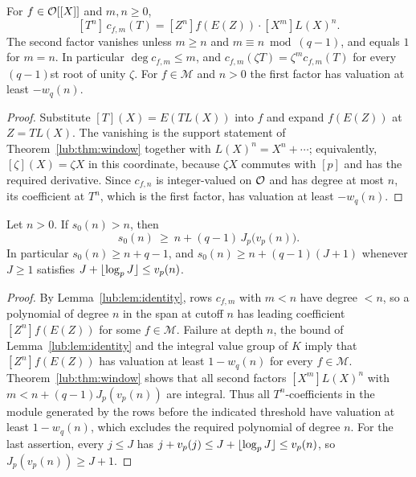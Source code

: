 \begin{lemma}\label{lub:lem:identity}
For $f\in\mathcal{O}[[X]]$ and $m,n\ge0$,
\[
 [T^n]\,c_{f,m}(T)=[Z^n]f(E(Z))\cdot[X^m]L(X)^n .
\]
The second factor vanishes unless $m\ge n$ and $m\equiv n\bmod(q-1)$, and equals $1$ for
$m=n$. In particular $\deg c_{f,m}\le m$, and
$c_{f,m}(\zeta T)=\zeta^mc_{f,m}(T)$ for every $(q-1)$st root of unity $\zeta$. For
$f\in\mathcal M$ and $n>0$ the first factor has valuation at least $-w_q(n)$.
\end{lemma}
\begin{proof}
Substitute $[T](X)=E(TL(X))$ into $f$ and expand $f(E(Z))$ at $Z=TL(X)$. The vanishing is
the support statement of Theorem~\ref{lub:thm:window} together with $L(X)^n=X^n+\cdots$;
equivalently, $[\zeta](X)=\zeta X$ in this coordinate, because $\zeta X$ commutes with
$[p]$ and has the required derivative. Since $c_{f,n}$ is integer-valued on $\mathcal{O}$ and has
degree at most $n$, its coefficient at $T^n$, which is the first factor, has valuation at
least $-w_q(n)$.
\end{proof}

\begin{corollary}\label{lub:cor:obstruction}
Let $n>0$. If $s_0(n)>n$, then
\[
 s_0(n)\ \ge\ n+(q-1)\,J_p\bigl(v_p(n)\bigr).
\]
In particular $s_0(n)\ge n+q-1$, and $s_0(n)\ge n+(q-1)(J+1)$ whenever $J\ge1$ satisfies
$J+\lfloor\log_pJ\rfloor\le v_p(n)$.
\end{corollary}
\begin{proof}
By Lemma~\ref{lub:lem:identity}, rows $c_{f,m}$ with $m<n$ have degree $<n$, so a polynomial of
degree $n$ in the span at cutoff $n$ has leading coefficient $[Z^n]f(E(Z))$ for some
$f\in\mathcal M$. Failure at depth $n$, the bound of Lemma~\ref{lub:lem:identity} and the
integral value group of $K$ imply that $[Z^n]f(E(Z))$ has valuation at least $1-w_q(n)$
for every $f\in\mathcal M$. Theorem~\ref{lub:thm:window} shows that all second factors
$[X^m]L(X)^n$ with $m<n+(q-1)J_p(v_p(n))$ are integral. Thus all $T^n$-coefficients in the
module generated by the rows before the indicated threshold have valuation at least
$1-w_q(n)$, which excludes the required polynomial of degree $n$. For the last assertion,
every $j\le J$ has $j+v_p(j)\le J+\lfloor\log_pJ\rfloor\le v_p(n)$, so $J_p(v_p(n))\ge J+1$.
\end{proof}


